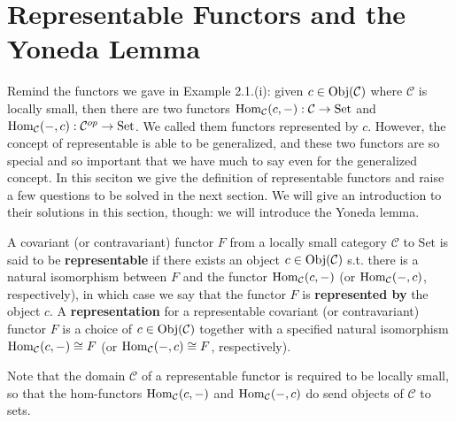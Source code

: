 \section{Representable Functors and the Yoneda Lemma}
Remind the functors we gave in Example 2.1.(i): given $c\in\operatorname{Obj}(\mathcal{C})$ where $\mathcal{C}$ is locally small, then there are two functors $\operatorname{Hom}_\mathcal{C}(c,-):\mathcal{C}\to\mathrm{Set}$ and $\operatorname{Hom}_\mathcal{C}(-,c):\mathcal{C}^{op}\to \mathrm{Set}$. We called them functors represented by $c$. However, the concept of representable is able to be generalized, and these two functors are so special and so important that we have much to say even for the generalized concept. In this seciton we give the definition of representable functors and 	raise a few questions to be solved in the next section. We will give an introduction to their solutions in this section, though: we will introduce the Yoneda lemma.
	\begin{definition}
		A covariant (or contravariant) functor $F$ from a locally small category $\mathcal{C}$ to $\mathrm{Set}$ is said to be \textbf{representable} if there exists an object $c\in\operatorname{Obj}(\mathcal{C})$ s.t. there is a natural isomorphism between $F$ and the functor $\operatorname{Hom}_\mathcal{C}(c,-)$ (or $\operatorname{Hom}_\mathcal{C}(-,c)$, respectively), in which case we say that the functor $F$ is \textbf{represented by} the object $c$. A \textbf{representation} for a representable covariant (or contravariant) functor $F$ is a choice of $c\in\operatorname{Obj}(\mathcal{C})$ together with a specified natural isomorphism $\operatorname{Hom}_\mathcal{C}(c,-)\cong F$ (or $\operatorname{Hom}_\mathcal{C}(-,c)\cong F$, respectively).
	\end{definition}
	Note that the domain $\mathcal{C}$ of a representable functor is required to be locally small, so that the hom-functors $\operatorname{Hom}_\mathcal{C}(c,-)$ and $\operatorname{Hom}_\mathcal{C}(-,c)$ do send objects of $\mathcal{C}$ to sets.
